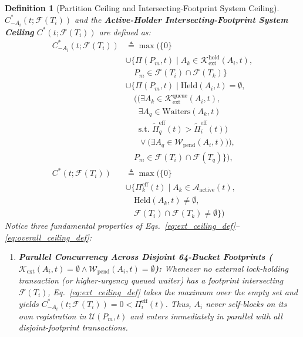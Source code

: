 \documentclass[conference,10pt]{IEEEtran}
\newtheorem{definition}{Definition}
\begin{document}
\begin{definition}[Partition Ceiling and Intersecting-Footprint System Ceiling]
$C_{-A_i}^*(t; \mathcal{F}(T_i))$ and the \textbf{Active-Holder Intersecting-Footprint System Ceiling} $C^*(t; \mathcal{F}(T_i))$ are defined as:
\begin{align}
\label{eq:ext_ceiling_def}
C_{-A_i}^*(t; \mathcal{F}(T_i)) &\triangleq \max \Big( \{0\} \nonumber \\
&\cup \big\{ \Pi(P_m, t) \;\big|\; A_k \in \mathcal{K}_{\text{ext}}^{\text{hold}}(A_i, t), \nonumber \\
&\quad P_m \in \mathcal{F}(T_i) \cap \mathcal{F}(T_k) \big\} \nonumber \\
&\cup \Big\{ \Pi(P_m, t) \;\Big|\; \text{Held}(A_i, t) = \emptyset, \nonumber \\
&\quad \Big(\big(\exists A_k \in \mathcal{K}_{\text{ext}}^{\text{queue}}(A_i, t), \nonumber \\
&\quad\;\; \exists A_q \in \text{Waiters}(A_k, t) \nonumber \\
&\quad\;\; \text{s.t. } \tilde{\Pi}_q^{\text{eff}}(t) > \tilde{\Pi}_i^{\text{eff}}(t)\big) \nonumber \\
&\quad\;\; \lor \big(\exists A_q \in \mathcal{W}_{\text{pend}}(A_i, t)\big)\Big), \nonumber \\
&\quad P_m \in \mathcal{F}(T_i) \cap \mathcal{F}(T_q) \Big\} \Big), \\
\label{eq:overall_ceiling_def}
C^*(t; \mathcal{F}(T_i)) &\triangleq \max \Big( \{0\} \nonumber \\
&\cup \big\{ \Pi_k^{\text{eff}}(t) \;\big|\; A_k \in \mathcal{A}_{\text{active}}(t), \nonumber \\
&\quad \text{Held}(A_k, t) \ne \emptyset, \nonumber \\
&\quad \mathcal{F}(T_i) \cap \mathcal{F}(T_k) \ne \emptyset \big\} \Big)
\end{align}
Notice three fundamental properties of Eqs.~\eqref{eq:ext_ceiling_def}--\eqref{eq:overall_ceiling_def}:
\begin{enumerate}
    \item \textbf{Parallel Concurrency Across Disjoint 64-Bucket Footprints ($\mathcal{K}_{\text{ext}}(A_i, t) = \emptyset \land \mathcal{W}_{\text{pend}}(A_i, t) = \emptyset$):} Whenever no external lock-holding transaction (or higher-urgency queued waiter) has a footprint intersecting $\mathcal{F}(T_i)$, Eq.~\eqref{eq:ext_ceiling_def} takes the maximum over the empty set and yields $C_{-A_i}^*(t; \mathcal{F}(T_i)) = 0 < \Pi_i^{\text{eff}}(t)$. Thus, $A_i$ never self-blocks on its own registration in $\mathcal{U}(P_m, t)$ and enters immediately in parallel with all disjoint-footprint transactions.

\end{enumerate}
\end{definition}
\end{document}

